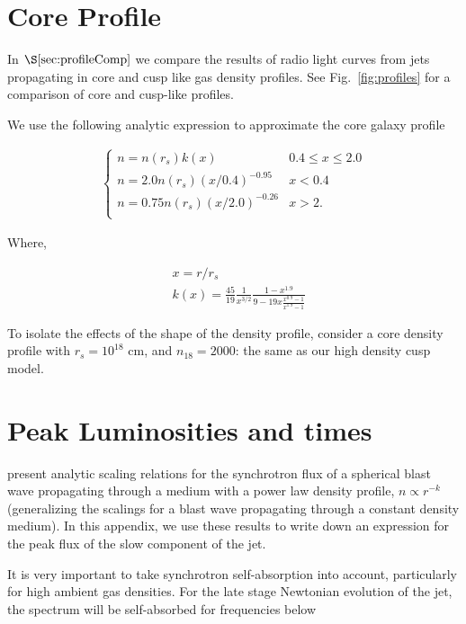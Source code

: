 \documentclass[usenatbib,fleqn]{mnras}
\begin{document}
\appendix
\section{Core Profile}
\label{app:core}
In $\S\ref{sec:profileComp}$ we compare the results of radio
light curves from jets propagating in core and cusp like gas density
profiles. See Fig.~\ref{fig:profiles} for a comparison of core and
cusp-like profiles. 

We use the following analytic expression to approximate the core
galaxy profile

\begin{align}
\begin{cases}
n=n(r_s) k(x) & 0.4 \leq x\leq 2.0\\
n = 2.0 n(r_s) (x/0.4)^{-0.95} & x < 0.4\\
n = 0.75 n(r_s) (x/2.0)^{-0.26} & x>2.\\
\end{cases}
\label{eq:cores}
\end{align}

Where, 

\begin{align}
  &x=r/r_s\\\nonumber
  &k(x)=\frac{45}{19} \frac{1}{x^{3/2}} \frac{1-x^{1.9}}{9-19
      x\frac{x^{0.9}-1}{x^{1.9}-1}}
\end{align}

To isolate the effects of the shape of the density profile, consider a
core density profile with $r_s=10^{18}$ cm, and $n_{18}=2000$: the
same as our high density cusp model.

\section{Peak Luminosities and times}
\label{app:analyt}
\citet{Leventis+2012} present analytic scaling relations for the
synchrotron flux of a spherical blast wave propagating through a
medium with a power law density profile, $n\propto r^{-k}$
(generalizing the \citealt{Nakar&Piran2011} scalings for a
blast wave propagating through a constant density medium). In this
appendix, we use these results to write down an expression for the
peak flux of the slow component of the jet.

It is very important to take synchrotron self-absorption into account,
particularly for high ambient gas densities. For the late stage
Newtonian evolution of the jet, the spectrum will be self-absorbed for
frequencies below
\end{document}
